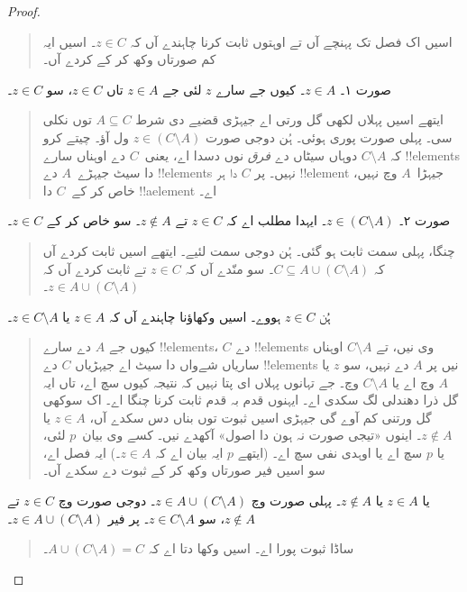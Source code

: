 \documentclass[../../../include/open-logic-section]{subfiles}
\begin{document}
\begin{proof}
\begin{quote}
    اسیں اک فصل تک پہنچے آں تے اوہتوں ثابت کرنا چاہندے آں کہ $z \in C$۔ اسیں ایہ کم صورتاں وکھ کر کے کردے آں۔
  \end{quote}
  صورت ۱۔ $z \in A$۔ کیوں جے سارے $z$ لئی جے $z \in A$ تاں $z \in C$، سو $z \in C$۔
  \begin{quote}
    ایتھے اسیں پہلاں لکھی گل ورتی اے جیہڑی قضیے دی شرط $A \subseteq C$ توں نکلی سی۔ پہلی صورت پوری ہوئی۔ ہُن دوجی صورت $z \in (C
    \setminus A)$ ول آؤ۔ چیتے کرو کہ $C \setminus A$ دوہاں سیٹاں دے \emph{فرق} نوں دسدا اے، یعنی~$C$ دے اوہناں سارے !!{element}s دا سیٹ جیہڑے~$A$ دے !!{element}s نہیں۔ پر $C$ دا ہر !!{element} جیہڑا~$A$ وچ نہیں، خاص کر کے~$C$ دا !!a{element} اے۔
  \end{quote}
  صورت ۲۔ $z \in (C \setminus A)$۔ ایہدا مطلب اے کہ $z \in C$ تے $z
  \notin A$۔ سو خاص کر کے $z \in C$۔
  \begin{quote}
    چنگا، پہلی سمت ثابت ہو گئی۔ ہُن دوجی سمت لئیے۔ ایتھے اسیں ثابت کردے آں کہ $C \subseteq A \cup (C \setminus
    A)$۔ سو منّدے آں کہ $z \in C$ تے ثابت کردے آں کہ $z \in A \cup (C
    \setminus A)$۔
  \end{quote}
  ہُن $z \in C$ ہووے۔ اسیں وکھاؤنا چاہندے آں کہ $z \in A$ یا $z \in C
  \setminus A$۔
  \begin{quote}
    کیوں جے $A$ دے سارے !!{element}s، $C$ دے !!{element}s وی نیں، تے $C
    \setminus A$ اوہناں ساریاں شےواں دا سیٹ اے جیہڑیاں $C$ دے !!{element}s نیں پر $A$ دے نہیں، سو $z$ یا $A$ وچ اے یا $C
    \setminus A$ وچ۔ جے تہانوں پہلاں ای پتا نہیں کہ نتیجہ کیوں سچ اے، تاں ایہ گل ذرا دھندلی لگ سکدی اے۔ ایہنوں قدم بہ قدم ثابت کرنا چنگا اے۔ اک سوکھی گل ورتنی کم آوے گی جیہڑی اسیں ثبوت توں بناں دس سکدے آں، $z \in A$ یا $z \notin A$۔ اینوں «تیجی صورت نہ ہون دا اصول» آکھدے نیں۔ کسے وی بیان~$p$ لئی، یا $p$ سچ اے یا اوہدی نفی سچ اے۔ (ایتھے $p$ ایہ بیان اے کہ $z \in A$۔) ایہ فصل اے، سو اسیں فیر صورتاں وکھ کر کے ثبوت دے سکدے آں۔
  \end{quote}
  یا $z \in A$ یا $z \notin A$۔ پہلی صورت وچ $z \in A \cup
  (C \setminus A)$۔ دوجی صورت وچ $z \in C$ تے $z \notin A$، سو $z \in C \setminus A$۔ پر فیر $z \in A \cup (C \setminus A)$۔
  \begin{quote}
    ساڈا ثبوت پورا اے۔ اسیں وکھا دتا اے کہ $A \cup (C \setminus A) = C$۔
  \end{quote}
\end{proof}
\end{document}
